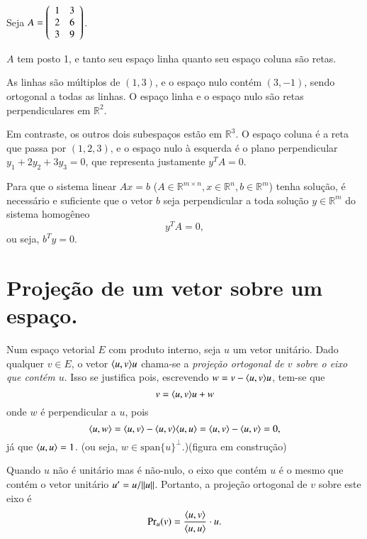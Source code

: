 \begin{exemplo}
Seja $A = \left( \begin{array}{c c} 1 & 3\\ 2 & 6\\ 3 & 9 \end{array}\right)$. 

$A$ tem posto 1, e tanto seu espaço linha quanto seu espaço coluna são retas.

As linhas são múltiplos de $(1,3)$, e o espaço nulo contém $(3,-1)$, sendo ortogonal a todas as linhas. O espaço linha e o espaço nulo são retas perpendiculares em ${\mathbb{R}}^2$.

Em contraste, os outros dois subespaços estão em ${\mathbb{R}}^3$. O espaço coluna é a reta que passa por $(1,2,3)$, e o espaço nulo à esquerda é o plano perpendicular $y_1+2y_2+3y_3=0$, que representa justamente $y^TA=0$.
\end{exemplo}

\begin{coro}
  Para que o sistema linear $Ax=b$ ($A\in {\mathbb{R}}^{m\times n}, x\in {\mathbb{R}}^n, b\in {\mathbb{R}}^m$) tenha solução, é necessário e suficiente que o vetor $b$ seja perpendicular a toda solução $y\in {\mathbb{R}}^m$ do sistema homogêneo
  \begin{equation*}
    y^TA=0,
  \end{equation*}
  ou seja, $b^Ty=0$.
\end{coro}

\section{Projeção de um vetor sobre um espaço.}

Num espaço vetorial $E$ com produto interno, seja $u$ um vetor unitário. Dado qualquer $v\in E$, o vetor $\langle u, v \rangle u$ chama-se a \emph{projeção ortogonal de $v$ sobre o eixo que contém $u$}. Isso se justifica pois, escrevendo $w=v-\langle u, v \rangle u$, tem-se que
\begin{equation*}
  v = \langle u, v \rangle u+w
\end{equation*}
onde $w$ é perpendicular a $u$, pois 
\begin{equation*}
  \langle u, w \rangle = \langle u, v \rangle-\langle u, v \rangle\langle u, u \rangle = \langle u, v \rangle-\langle u, v \rangle=0,
\end{equation*}
já que $\langle u, u \rangle=1$. (ou seja, $w\in \text{span}\{u\}^{\perp}$.)(figura em construção)

Quando $u$ não é unitário mas é não-nulo, o eixo que contém $u$ é o mesmo que contém o vetor unitário $u'=u/\| u \|$. Portanto, a projeção ortogonal de $v$ sobre este eixo é 
\begin{equation*}
  \text{Pr}_u(v) = \frac{\langle u, v \rangle}{\langle u, u \rangle}\cdot u.
\end{equation*}

